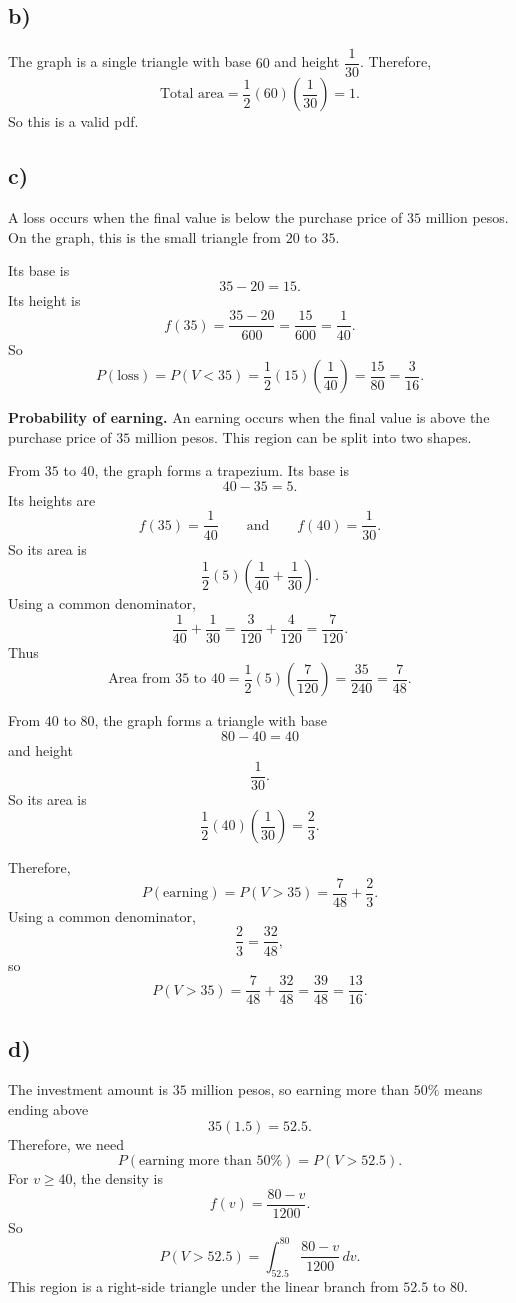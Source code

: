 \subsection*{b)}
The graph is a single triangle with base $60$ and height $\dfrac{1}{30}$. Therefore,
\[
\text{Total area}=\frac12(60)\left(\frac{1}{30}\right)=1.
\]
So this is a valid pdf.

\subsection*{c)}
A loss occurs when the final value is below the purchase price of $35$ million pesos. On the graph, this is the small triangle from $20$ to $35$.

Its base is
\[
35-20=15.
\]
Its height is
\[
f(35)=\frac{35-20}{600}=\frac{15}{600}=\frac{1}{40}.
\]
So
\[
P(\text{loss})=P(V<35)=\frac12(15)\left(\frac{1}{40}\right)=\frac{15}{80}=\frac{3}{16}.
\]

\textbf{Probability of earning.}
An earning occurs when the final value is above the purchase price of $35$ million pesos. This region can be split into two shapes.

From $35$ to $40$, the graph forms a trapezium. Its base is
\[
40-35=5.
\]
Its heights are
\[
f(35)=\frac{1}{40}
\qquad \text{and} \qquad
f(40)=\frac{1}{30}.
\]
So its area is
\[
\frac12(5)\left(\frac{1}{40}+\frac{1}{30}\right).
\]
Using a common denominator,
\[
\frac{1}{40}+\frac{1}{30}=\frac{3}{120}+\frac{4}{120}=\frac{7}{120}.
\]
Thus
\[
\text{Area from }35\text{ to }40
=\frac12(5)\left(\frac{7}{120}\right)
=\frac{35}{240}
=\frac{7}{48}.
\]

From $40$ to $80$, the graph forms a triangle with base
\[
80-40=40
\]
and height
\[
\frac{1}{30}.
\]
So its area is
\[
\frac12(40)\left(\frac{1}{30}\right)=\frac{2}{3}.
\]

Therefore,
\[
P(\text{earning})=P(V>35)=\frac{7}{48}+\frac{2}{3}.
\]
Using a common denominator,
\[
\frac{2}{3}=\frac{32}{48},
\]
so
\[
P(V>35)=\frac{7}{48}+\frac{32}{48}=\frac{39}{48}=\frac{13}{16}.
\]

\subsection*{d)}
The investment amount is $35$ million pesos, so earning more than $50\%$ means ending above
\[
35(1.5)=52.5.
\]
Therefore, we need
\[
P(\text{earning more than }50\%)=P(V>52.5).
\]
For $v\ge 40$, the density is
\[
f(v)=\frac{80-v}{1200}.
\]
So
\[
P(V>52.5)=\int_{52.5}^{80}\frac{80-v}{1200}\,dv.
\]
This region is a right-side triangle under the linear branch from $52.5$ to $80$.

